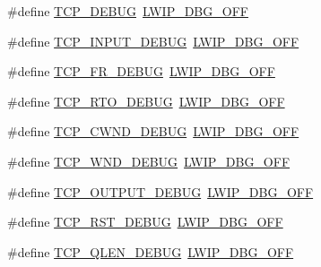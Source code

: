\begin{DoxyCompactItemize}
\item 
\#define \hyperlink{group__lwip__opts__debugmsg_ga4f43bb8a430c7a52a1ad5086d3f2803c}{T\+C\+P\+\_\+\+D\+E\+B\+UG}~\hyperlink{group__debugging__levels_gadab1cdc3f45939a3a5c9a3d7e04987e1}{L\+W\+I\+P\+\_\+\+D\+B\+G\+\_\+\+O\+FF}
\item 
\#define \hyperlink{group__lwip__opts__debugmsg_gaf51dc2563536de56470146749f715ba8}{T\+C\+P\+\_\+\+I\+N\+P\+U\+T\+\_\+\+D\+E\+B\+UG}~\hyperlink{group__debugging__levels_gadab1cdc3f45939a3a5c9a3d7e04987e1}{L\+W\+I\+P\+\_\+\+D\+B\+G\+\_\+\+O\+FF}
\item 
\#define \hyperlink{group__lwip__opts__debugmsg_ga5895bee26e8e1a0b89d597e0f2580b23}{T\+C\+P\+\_\+\+F\+R\+\_\+\+D\+E\+B\+UG}~\hyperlink{group__debugging__levels_gadab1cdc3f45939a3a5c9a3d7e04987e1}{L\+W\+I\+P\+\_\+\+D\+B\+G\+\_\+\+O\+FF}
\item 
\#define \hyperlink{group__lwip__opts__debugmsg_gad6e52e37415d0d0cbe4931a28f5a9662}{T\+C\+P\+\_\+\+R\+T\+O\+\_\+\+D\+E\+B\+UG}~\hyperlink{group__debugging__levels_gadab1cdc3f45939a3a5c9a3d7e04987e1}{L\+W\+I\+P\+\_\+\+D\+B\+G\+\_\+\+O\+FF}
\item 
\#define \hyperlink{group__lwip__opts__debugmsg_ga66df03d8192cd978d3321a9d68bf5411}{T\+C\+P\+\_\+\+C\+W\+N\+D\+\_\+\+D\+E\+B\+UG}~\hyperlink{group__debugging__levels_gadab1cdc3f45939a3a5c9a3d7e04987e1}{L\+W\+I\+P\+\_\+\+D\+B\+G\+\_\+\+O\+FF}
\item 
\#define \hyperlink{group__lwip__opts__debugmsg_ga3704f433e947d6342da77c74e33627e1}{T\+C\+P\+\_\+\+W\+N\+D\+\_\+\+D\+E\+B\+UG}~\hyperlink{group__debugging__levels_gadab1cdc3f45939a3a5c9a3d7e04987e1}{L\+W\+I\+P\+\_\+\+D\+B\+G\+\_\+\+O\+FF}
\item 
\#define \hyperlink{group__lwip__opts__debugmsg_ga9f70601fdc1feee490772bf7fcdb74fb}{T\+C\+P\+\_\+\+O\+U\+T\+P\+U\+T\+\_\+\+D\+E\+B\+UG}~\hyperlink{group__debugging__levels_gadab1cdc3f45939a3a5c9a3d7e04987e1}{L\+W\+I\+P\+\_\+\+D\+B\+G\+\_\+\+O\+FF}
\item 
\#define \hyperlink{group__lwip__opts__debugmsg_ga37596f7bbb9b7663826244ba54486679}{T\+C\+P\+\_\+\+R\+S\+T\+\_\+\+D\+E\+B\+UG}~\hyperlink{group__debugging__levels_gadab1cdc3f45939a3a5c9a3d7e04987e1}{L\+W\+I\+P\+\_\+\+D\+B\+G\+\_\+\+O\+FF}
\item 
\#define \hyperlink{group__lwip__opts__debugmsg_gae7980c7f8eb45cd411bf410ff0a3fc55}{T\+C\+P\+\_\+\+Q\+L\+E\+N\+\_\+\+D\+E\+B\+UG}~\hyperlink{group__debugging__levels_gadab1cdc3f45939a3a5c9a3d7e04987e1}{L\+W\+I\+P\+\_\+\+D\+B\+G\+\_\+\+O\+FF}
\item 

\end{DoxyCompactItemize}
